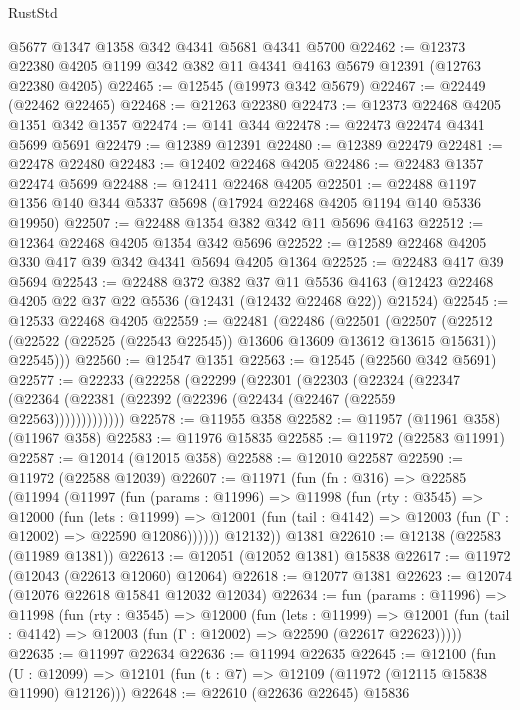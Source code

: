 \begin{lexlean}{RustStd}
\begin{coremodule}
    @5677
    @1347
    @1358
    @342
    @4341
    @5681
    @4341
    @5700
@22462 := @12373 @22380 @4205 @1199 @342 @382 @11 @4341 @4163 @5679 @12391 (@12763 @22380 @4205)
@22465 := @12545 (@19973 @342 @5679)
@22467 := @22449 (@22462 @22465)
@22468 := @21263 @22380
@22473 := @12373 @22468 @4205 @1351 @342 @1357
@22474 := @141 @344
@22478 := @22473 @22474 @4341 @5699 @5691
@22479 := @12389 @12391
@22480 := @12389 @22479
@22481 := @22478 @22480
@22483 := @12402 @22468 @4205
@22486 := @22483 @1357 @22474 @5699
@22488 := @12411 @22468 @4205
@22501 := @22488 @1197 @1356 @140 @344 @5337 @5698 (@17924 @22468 @4205 @1194 @140 @5336 @19950)
@22507 := @22488 @1354 @382 @342 @11 @5696 @4163
@22512 := @12364 @22468 @4205 @1354 @342 @5696
@22522 := @12589 @22468 @4205 @330 @417 @39 @342 @4341 @5694 @4205 @1364
@22525 := @22483 @417 @39 @5694
@22543 := @22488
    @372
    @382
    @37
    @11
    @5536
    @4163
    (@12423 @22468 @4205 @22 @37 @22 @5536 (@12431 (@12432 @22468 @22)) @21524)
@22545 := @12533 @22468 @4205
@22559 := @22481
    (@22486
      (@22501
        (@22507
          (@22512 (@22522 (@22525 (@22543 @22545)) @13606 @13609 @13612 @13615 @15631))
          @22545)))
@22560 := @12547 @1351
@22563 := @12545 (@22560 @342 @5691)
@22577 := @22233
    (@22258
      (@22299
        (@22301
          (@22303
            (@22324
              (@22347 (@22364 (@22381 (@22392 (@22396 (@22434 (@22467 (@22559 @22563)))))))))))))
@22578 := @11955 @358
@22582 := @11957 (@11961 @358) (@11967 @358)
@22583 := @11976 @15835
@22585 := @11972 (@22583 @11991)
@22587 := @12014 (@12015 @358)
@22588 := @12010 @22587
@22590 := @11972 (@22588 @12039)
@22607 := @11971
    (fun (fn : @316) =>
    @22585
      (@11994
        (@11997
          (fun (params : @11996) =>
          @11998
            (fun (rty : @3545) =>
            @12000
              (fun (lets : @11999) =>
              @12001 (fun (tail : @4142) => @12003 (fun (Γ : @12002) => @22590 @12086))))))
        @12132))
    @1381
@22610 := @12138 (@22583 (@11989 @1381))
@22613 := @12051 (@12052 @1381) @15838
@22617 := @11972 (@12043 (@22613 @12060) @12064)
@22618 := @12077 @1381
@22623 := @12074 (@12076 @22618 @15841 @12032 @12034)
@22634 := fun (params : @11996) =>
  @11998
    (fun (rty : @3545) =>
    @12000
      (fun (lets : @11999) =>
      @12001 (fun (tail : @4142) => @12003 (fun (Γ : @12002) => @22590 (@22617 @22623)))))
@22635 := @11997 @22634
@22636 := @11994 @22635
@22645 := @12100
    (fun (U : @12099) => @12101 (fun (t : @7) => @12109 (@11972 (@12115 @15838 @11990) @12126)))
@22648 := @22610 (@22636 @22645) @15836

\end{coremodule}
\end{lexlean}

